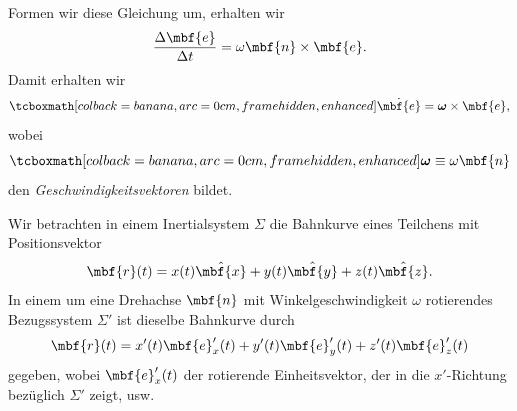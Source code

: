 \begin{enumerate}
\begin{equation}
  \end{equation}
  Formen wir diese Gleichung um, erhalten wir
  \begin{equation}
    \frac{\Delta \mbf{e}}{\Delta t} = \omega \mbf{n}\times \mbf{e}.
  \end{equation}
  Damit erhalten wir
  \begin{equation}
    \eqbox{\dot{\mbf{e}} = \boldsymbol{\omega}\times \mbf{e},}
  \end{equation}
  wobei 
  \begin{equation}
    \eqbox{\boldsymbol{\omega} \equiv \omega \mbf{n}}
  \end{equation}
  den \emph{Geschwindigkeitsvektoren} bildet.

Wir betrachten in einem Inertialsystem $\Sigma$ die Bahnkurve eines Teilchens  mit Positionsvektor
\begin{equation}
  \mbf{r}(t) = x(t) \hat{\mbf{x}} + y(t) \hat{\mbf{y}} +z(t) \hat{\mbf{z}}.
\end{equation}
In einem um eine Drehachse $\mbf{n}$ mit Winkelgeschwindigkeit $\omega$ rotierendes Bezugssystem $\Sigma'$ ist dieselbe Bahnkurve durch
\begin{equation}
  \mbf{r}(t) = x'(t) \mbf{e}_x'(t) + y'(t) \mbf{e}_y'(t) + z'(t) \mbf{e}_z'(t)
\end{equation}
gegeben, wobei $\mbf{e}_x'(t)$ der rotierende Einheitsvektor, der in die $x'$-Richtung bezüglich $\Sigma'$ zeigt, usw.


\end{enumerate}
